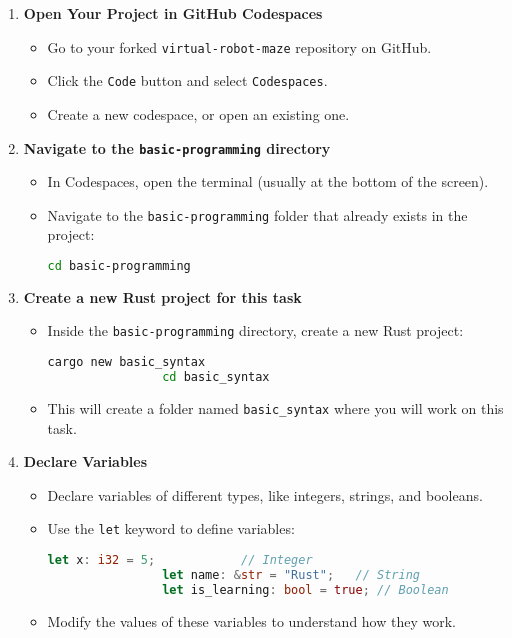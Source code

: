 \documentclass[12pt]{article}
\begin{document}
	\begin{enumerate}
		\item \textbf{Open Your Project in GitHub Codespaces}
		\begin{itemize}
			\item Go to your forked \texttt{virtual-robot-maze} repository on GitHub.
			\item Click the \texttt{Code} button and select \texttt{Codespaces}.
			\item Create a new codespace, or open an existing one.
		\end{itemize}
		
		\item \textbf{Navigate to the \texttt{basic-programming} directory}
		\begin{itemize}
			\item In Codespaces, open the terminal (usually at the bottom of the screen).
			\item Navigate to the \texttt{basic-programming} folder that already exists in the project:
			\begin{lstlisting}[language=bash]
				cd basic-programming
			\end{lstlisting}
		\end{itemize}
		
		\item \textbf{Create a new Rust project for this task}
		\begin{itemize}
			\item Inside the \texttt{basic-programming} directory, create a new Rust project:
			\begin{lstlisting}[language=bash]
				cargo new basic_syntax
				cd basic_syntax
			\end{lstlisting}
			\item This will create a folder named \texttt{basic\_syntax} where you will work on this task.
		\end{itemize}
		
		\item \textbf{Declare Variables}
		\begin{itemize}
			\item Declare variables of different types, like integers, strings, and booleans.
			\item Use the \texttt{let} keyword to define variables:
			\begin{lstlisting}[language=Rust]
				let x: i32 = 5;            // Integer
				let name: &str = "Rust";   // String
				let is_learning: bool = true; // Boolean
			\end{lstlisting}
			\item Modify the values of these variables to understand how they work.
		\end{itemize}
		

\end{enumerate}
\end{document}

